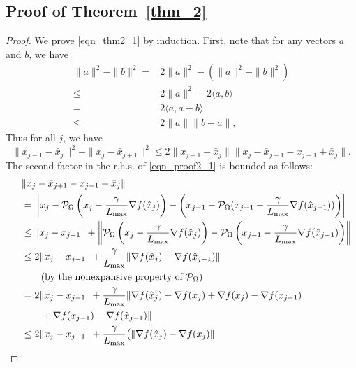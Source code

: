 \documentclass{siamltex}
\begin{document}
\subsection{Proof of Theorem~\ref{thm_2}}

\begin{proof}
We prove \eqref{eqn_thm2_1} by induction. First, note that for any
vectors $a$ and $b$, we have
\begin{align*}
\|a\|^2 - \|b\|^2 = & 2\|a\|^2 -(\|a\|^2+\|b\|^2) 
\\ \leq &
2\|a\|^2 -
2\langle a, b\rangle 
\\ = & 
2\langle a, a-b \rangle 
\\ \leq & 
2\|a\|\|b-a\|,
\end{align*}
Thus for all $j$, we have
\begin{equation}
\|x_{j-1}-\bar{x}_j\|^2 - \|x_j-\bar{x}_{j+1}\|^2 \leq 2\|x_{j-1}-\bar{x}_j\| {\|x_j-\bar{x}_{j+1}-x_{j-1}+\bar{x}_j\|}.
\label{eqn_proof2_1}
\end{equation}
The second factor in the r.h.s. of \eqref{eqn_proof2_1} is bounded as follows:
\begin{align}
\nonumber
&\|x_j-\bar{x}_{j+1}-x_{j-1}+\bar{x}_j\|\\
\nonumber
\quad &= \left\|x_j-{\mathcal{P}_{\Omega}}\left(x_j-{\gamma \over {L_{\mbox{\rm\scriptsize max}}}} \nabla f({\hat{x}}_{j})\right)-\left(x_{j-1}-{\mathcal{P}_{\Omega}}(x_{j-1}-{\gamma \over {L_{\mbox{\rm\scriptsize max}}}} \nabla f({\hat{x}}_{j-1}))\right)\right\|\\
\nonumber
&\leq \|x_j- x_{j-1}\| + \left\|{\mathcal{P}_{\Omega}}\left(x_j-{\gamma \over {L_{\mbox{\rm\scriptsize max}}}} \nabla f({\hat{x}}_{j})\right)-{\mathcal{P}_{\Omega}}\left(x_{j-1}-{\gamma \over {L_{\mbox{\rm\scriptsize max}}}} \nabla f({\hat{x}}_{j-1})\right)\right\|\\
\nonumber
&\leq 2\|x_j-x_{j-1}\| + {\gamma \over {L_{\mbox{\rm\scriptsize max}}}} \|\nabla f({\hat{x}}_{j}) - \nabla f({\hat{x}}_{j-1})\| 
\\
\nonumber
&\quad \quad (\text{by the nonexpansive property of ${\mathcal{P}_{\Omega}}$}) \\
\nonumber
& = 2\|x_j-x_{j-1}\| + {\gamma \over {L_{\mbox{\rm\scriptsize max}}}} \|\nabla f({\hat{x}}_{j}) - \nabla f(x_j) + \nabla f(x_j)  - \nabla f(x_{j-1})
\\ \nonumber
& \quad \quad + \nabla f(x_{j-1}) - \nabla f({\hat{x}}_{j-1})\| \\
\nonumber
&\leq 2\|x_j-x_{j-1}\| + {\gamma \over {L_{\mbox{\rm\scriptsize max}}}} \big(\|\nabla f({\hat{x}}_{j}) - \nabla f(x_j)\|

\end{align}
\end{proof}
\end{document}
